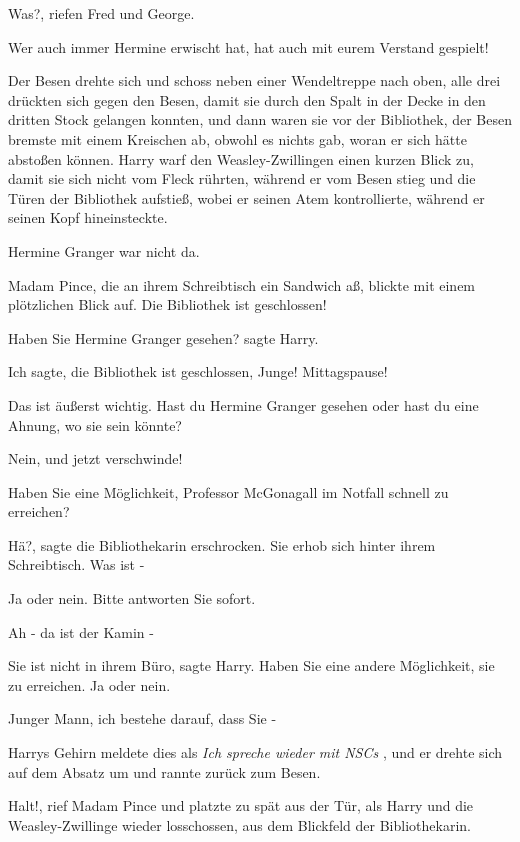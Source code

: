 \glqq Was?\grqq{}, riefen Fred und George.

\glqq Wer auch immer Hermine erwischt hat, hat auch mit eurem Verstand
gespielt!\grqq{}

Der Besen drehte sich und schoss neben einer Wendeltreppe nach oben, alle drei
drückten sich gegen den Besen, damit sie durch den Spalt in der Decke in den
dritten Stock gelangen konnten, und dann waren sie vor der Bibliothek, der Besen
bremste mit einem Kreischen ab, obwohl es nichts gab, woran er sich hätte
abstoßen können. Harry warf den Weasley-Zwillingen einen kurzen Blick zu, damit
sie sich nicht vom Fleck rührten, während er vom Besen stieg und die Türen der
Bibliothek aufstieß, wobei er seinen Atem kontrollierte, während er seinen Kopf
hineinsteckte.

Hermine Granger war nicht da.

Madam Pince, die an ihrem Schreibtisch ein Sandwich aß, blickte mit einem
plötzlichen Blick auf. \glqq Die Bibliothek ist geschlossen!\grqq{}

\glqq Haben Sie Hermine Granger gesehen?\grqq{} sagte Harry.

\glqq Ich sagte, die Bibliothek ist geschlossen, Junge! Mittagspause!\grqq{}

\glqq Das ist äußerst wichtig. Hast du Hermine Granger gesehen oder hast du eine
Ahnung, wo sie sein könnte?\grqq{}

\glqq Nein, und jetzt verschwinde!\grqq{}

\glqq Haben Sie eine Möglichkeit, Professor McGonagall im Notfall schnell zu
erreichen?\grqq{}

\glqq Hä?\grqq{}, sagte die Bibliothekarin erschrocken. Sie erhob sich hinter
ihrem Schreibtisch. \glqq Was ist -\grqq{}

\glqq Ja oder nein. Bitte antworten Sie sofort.\grqq{}

\glqq Ah - da ist der Kamin -\grqq{}

\glqq Sie ist nicht in ihrem Büro\grqq{}, sagte Harry. \glqq Haben Sie eine
andere Möglichkeit, sie zu erreichen. Ja oder nein.\grqq{}

\glqq Junger Mann, ich bestehe darauf, dass Sie -\grqq{}

Harrys Gehirn meldete dies als\emph{ \glqq Ich spreche wieder mit NSCs\grqq{} },
und er drehte sich auf dem Absatz um und rannte zurück zum Besen.

\glqq Halt!\grqq{}, rief Madam Pince und platzte zu spät aus der Tür, als Harry
und die Weasley-Zwillinge wieder losschossen, aus dem Blickfeld der
Bibliothekarin.

